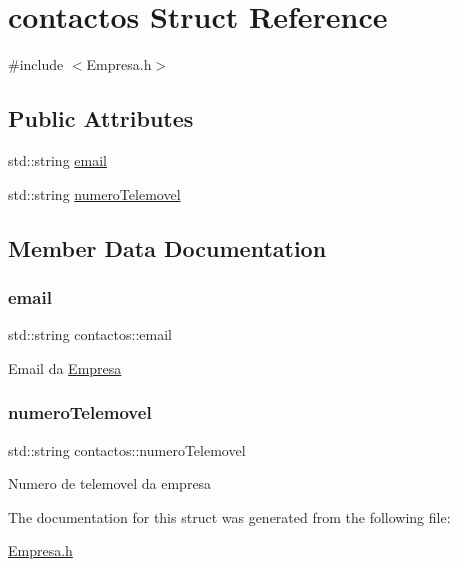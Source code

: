 \hypertarget{structcontactos}{}\section{contactos Struct Reference}
\label{structcontactos}


{\ttfamily \#include $<$Empresa.\+h$>$}

\subsection*{Public Attributes}
\begin{DoxyCompactItemize}
\item 
std\+::string \hyperlink{structcontactos_a86c1ad3bcc23dbb8bf7bb37ae0976242}{email}
\item 
std\+::string \hyperlink{structcontactos_a09e1d4029e1eb91fc9ec76e4b4b6d48a}{numero\+Telemovel}
\end{DoxyCompactItemize}


\subsection{Member Data Documentation}
\mbox{\label{structcontactos_a86c1ad3bcc23dbb8bf7bb37ae0976242}} 
\subsubsection{\texorpdfstring{email}{email}}
{\footnotesize\ttfamily std\+::string contactos\+::email}

Email da \hyperlink{classEmpresa}{Empresa} \mbox{\label{structcontactos_a09e1d4029e1eb91fc9ec76e4b4b6d48a}} 
\subsubsection{\texorpdfstring{numero\+Telemovel}{numeroTelemovel}}
{\footnotesize\ttfamily std\+::string contactos\+::numero\+Telemovel}

Numero de telemovel da empresa 

The documentation for this struct was generated from the following file\+:\begin{DoxyCompactItemize}
\item 
\hyperlink{Empresa_8h}{Empresa.\+h}\end{DoxyCompactItemize}
